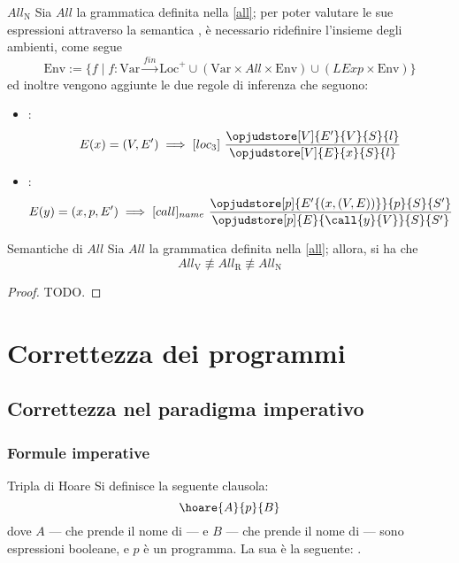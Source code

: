 \documentclass[a4paper, 12pt]{report}
\begin{document}
    \begin{framedprop}[label={all n}]{$All_\mathrm{N}$}
        Sia $All$ la grammatica definita nella \cref{all}; per poter valutare le sue espressioni attraverso la semantica , è necessario ridefinire l'insieme degli ambienti, come segue $$\mathrm{Env} := \{f \mid f : \mathrm{Var} \xrightarrow{fin} \mathrm{Loc}^+ \cup (\mathrm{Var} \times All \times \mathrm{Env}) \cup (LExp \times \mathrm{Env})\}$$ ed inoltre vengono aggiunte le due regole di inferenza che seguono:

        \begin{itemize}
            \item {}: $$E(x) = (V, E') \implies [loc_3] \ \dfrac{\opjudstore[V]{E'}{V}{S}{l}}{\opjudstore[V]{E}{x}{S}{l}}$$
            \item {}: $$E(y) = (x, p, E') \implies [call]_{name} \ \dfrac{\opjudstore[p]{E'\{(x,(V,E))\}}{p}{S}{S'}}{\opjudstore[p]{E}{\call{y}{V}}{S}{S'}}$$
        \end{itemize}
    \end{framedprop}

    \begin{framedlem}{Semantiche di $All$}
        Sia $All$ la grammatica definita nella \cref{all}; allora, si ha che $$All_\mathrm{V} \not\equiv All_\mathrm{R} \not\equiv All_\mathrm{N}$$
    \end{framedlem}
    
    \begin{proof}
        TODO.
    \end{proof}

    \chapter{Correttezza dei programmi}
    
    \section{Correttezza nel paradigma imperativo}

    \subsection{Formule imperative}

    \begin{frameddefn}{Tripla di Hoare}
        Si definisce  la seguente clausola: $$\hoare{A}{p}{B}$$ dove $A$ --- che prende il nome di  --- e $B$ --- che prende il nome di  --- sono espressioni booleane, e $p$ è un programma. La sua  è la seguente: .
    \end{frameddefn}
\end{document}
